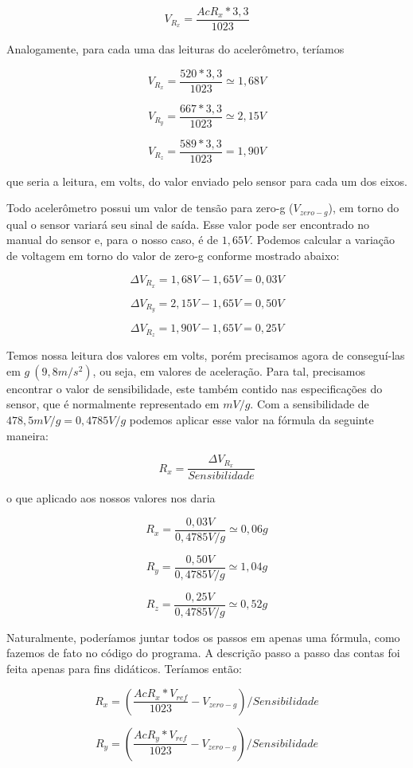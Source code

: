 \documentclass[a4paper,12pt]{article}
\begin{document}
$$V_{R_x} = \frac{AcR_x\ast3,3}{1023}$$ 

Analogamente, para cada uma das leituras do acelerômetro, teríamos

$$V_{R_x} = \frac{520\ast3,3}{1023} \simeq 1,68 V$$

$$V_{R_y} = \frac{667\ast3,3}{1023} \simeq 2,15 V$$

$$V_{R_z} = \frac{589\ast3,3}{1023} = 1,90 V$$

que seria a leitura, em volts, do valor enviado pelo sensor para cada um dos eixos.

Todo acelerômetro possui um valor de tensão para zero-g ($V_{zero-g}$), em torno do qual o sensor variará seu sinal de saída. Esse valor pode ser encontrado no manual do sensor e, para o nosso caso, é de $1,65V$. Podemos calcular a variação de voltagem em torno do valor de zero-g conforme mostrado abaixo:

$$\Delta V_{R_x} = 1,68V - 1,65V=0,03V$$

$$\Delta V_{R_y} = 2,15V - 1,65V=0,50V$$

$$\Delta V_{R_z} = 1,90V - 1,65V=0,25V$$

Temos nossa leitura dos valores em volts, porém precisamos agora de conseguí-las em $g\ (9,8m/s^2)$, ou seja, em valores de aceleração. Para tal, precisamos encontrar o valor de sensibilidade, este também contido nas especificações do sensor, que é normalmente representado em $mV/g$. Com a sensibilidade de $478,5mV/g = 0,4785 V/g$ podemos aplicar esse valor na fórmula da seguinte maneira:

$$R_x = \frac{\Delta V_{R_x}}{Sensibilidade}$$

\medskip
\noindent
o que aplicado aos nossos valores nos daria

$$R_x=\frac{0,03 V}{0,4785 V/g}\simeq0,06g$$

$$R_y=\frac{0,50 V}{0,4785 V/g}\simeq1,04g$$

$$R_z=\frac{0,25 V}{0,4785 V/g}\simeq0,52g$$

Naturalmente, poderíamos juntar todos os passos em apenas uma fórmula, como fazemos de fato no código do programa. A descrição passo a passo das contas foi feita apenas para fins didáticos. Teríamos então:

\begin{equation}
R_x=(\frac{AcR_x\ast V_{ref}}{1023}-V_{zero-g})/Sensibilidade
\label{eq2}
\end{equation}

$$R_y=(\frac{AcR_y\ast V_{ref}}{1023}-V_{zero-g})/Sensibilidade$$
\end{document}
